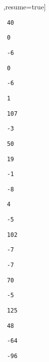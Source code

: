 \begin{solution}
\begin{sltasks}[counter-format=1.tsk[1],resume=true]
\begin{items}
        \item \texttt{ 40 }
        \item \texttt{ 0 }
        \item \texttt{ -6 }
    \end{items}
    \task
    \begin{items}
        \item \texttt{ 0 }
        \item \texttt{ -6 }
        \item \texttt{ 1 }
        \item \texttt{ 107 }
        \item \texttt{ -3 }
    \end{items}
    \task
    \begin{items}
        \item \texttt{ 50 }
        \item \texttt{ 19 }
        \item \texttt{ -1 }
        \item \texttt{ -8 }
        \item \texttt{ 4 }
    \end{items}
    \task
    \begin{items}
        \item \texttt{ -5 }
        \item \texttt{ 102 }
        \item \texttt{ -7 }
        \item \texttt{ -7 }
        \item \texttt{ 70 }
    \end{items}
    \task
    \begin{items}
        \item \texttt{ -5 }
        \item \texttt{ 125 }
        \item \texttt{ 48 }
        \item \texttt{ -64 }
        \item \texttt{ -96 }
    \end{items}
\end{sltasks}
\end{solution}
